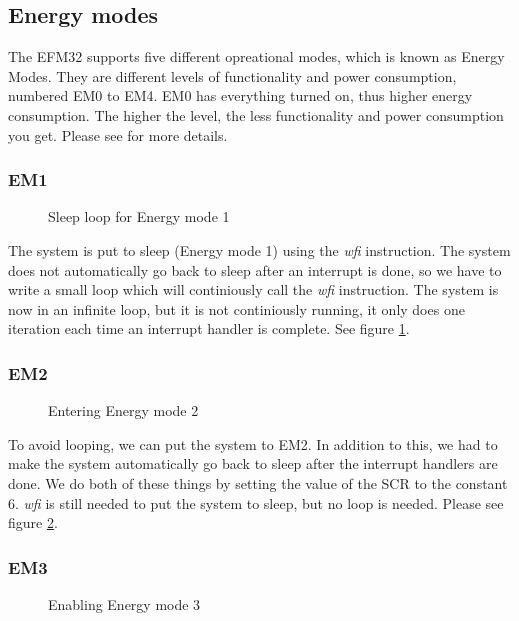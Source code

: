 	\subsection{Energy modes}
	The EFM32 supports five different opreational modes, which is known as Energy Modes. They are different levels of functionality and power consumption, numbered EM0 to EM4. EM0 has everything turned on, thus higher energy consumption. The higher the level, the less functionality and power consumption you get. Please see \cite[p. 2]{energy_optimization_application_note} for more details. 

	\subsubsection{EM1}
	\label{subsubsection:em1}

	\begin{figure}[t]
		
		\caption{Sleep loop for Energy mode 1}
		\label{code:em1}
	\end{figure}
	The system is put to sleep (Energy mode 1) using the \emph{wfi} instruction. The system does not automatically go back to sleep after an interrupt is done, so we have to write a small loop which will continiously call the \emph{wfi} instruction. The system is now in an infinite loop, but it is not continiously running, it only does one iteration each time an interrupt handler is complete. See figure \ref{code:em1}.

	\subsubsection{EM2}
	\label{subsubsection:em2}
	
	\begin{figure}[t]
		
		\caption{Entering Energy mode 2}
		\label{code:wfi_scr}
	\end{figure}

	To avoid looping, we can put the system to EM2. In addition to this, we had to make the system automatically go back to sleep after the interrupt handlers are done. We do both of these things by setting the value of the SCR to the constant $6$. \emph{wfi} is still needed to put the system to sleep, but no loop is needed. Please see figure \ref{code:wfi_scr}.

		\subsubsection{EM3}
		\label{subsubsection:em3}	
		\begin{figure}[t]
			
			\caption{Enabling Energy mode 3}
			\label{code:em3}
		\end{figure}

